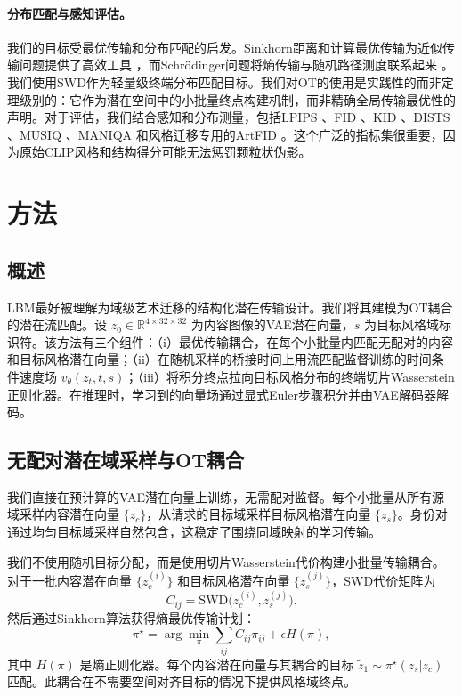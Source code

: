 \documentclass[letterpaper]{article}
\begin{document}
\paragraph{分布匹配与感知评估。}
我们的目标受最优传输和分布匹配的启发。Sinkhorn距离和计算最优传输为近似传输问题提供了高效工具 \cite{cuturi2013sinkhorn,peyre2019computational}，而Schrödinger问题将熵传输与随机路径测度联系起来 \cite{leonard2014survey}。我们使用SWD作为轻量级终端分布匹配目标。我们对OT的使用是实践性的而非定理级别的：它作为潜在空间中的小批量终点构建机制，而非精确全局传输最优性的声明。对于评估，我们结合感知和分布测量，包括LPIPS \cite{zhang2018lpips}、FID \cite{heusel2017fid}、KID \cite{binkowski2018kid}、DISTS \cite{ding2020dists}、MUSIQ \cite{ke2021musiq}、MANIQA \cite{yang2022maniqa}和风格迁移专用的ArtFID \cite{wright2022artfid}。这个广泛的指标集很重要，因为原始CLIP风格和结构得分可能无法惩罚颗粒状伪影。

\section{方法}
\subsection{概述}
LBM最好被理解为域级艺术迁移的结构化潜在传输设计。我们将其建模为OT耦合的潜在流匹配。设 $z_0 \in \mathbb{R}^{4 \times 32 \times 32}$ 为内容图像的VAE潜在向量，$s$ 为目标风格域标识符。该方法有三个组件：（i）最优传输耦合，在每个小批量内匹配无配对的内容和目标风格潜在向量；（ii）在随机采样的桥接时间上用流匹配监督训练的时间条件速度场 $v_\theta(z_t,t,s)$；（iii）将积分终点拉向目标风格分布的终端切片Wasserstein正则化器。在推理时，学习到的向量场通过显式Euler步骤积分并由VAE解码器解码。

\subsection{无配对潜在域采样与OT耦合}
我们直接在预计算的VAE潜在向量上训练，无需配对监督。每个小批量从所有源域采样内容潜在向量 $\{z_c\}$，从请求的目标域采样目标风格潜在向量 $\{z_s\}$。身份对通过均匀目标域采样自然包含，这稳定了围绕同域映射的学习传输。

我们不使用随机目标分配，而是使用切片Wasserstein代价构建小批量传输耦合。对于一批内容潜在向量 $\{z_c^{(i)}\}$ 和目标风格潜在向量 $\{z_s^{(j)}\}$，SWD代价矩阵为
\begin{equation}
    C_{ij} = \mathrm{SWD}\bigl(z_c^{(i)}, z_s^{(j)}\bigr) .
\end{equation}
然后通过Sinkhorn算法获得熵最优传输计划：
\begin{equation}
    \pi^\star = \arg\min_\pi \sum_{ij} C_{ij}\pi_{ij} + \epsilon H(\pi),
\end{equation}
其中 $H(\pi)$ 是熵正则化器。每个内容潜在向量与其耦合的目标 $\tilde{z}_1 \sim \pi^\star(z_s|z_c)$ 匹配。此耦合在不需要空间对齐目标的情况下提供风格域终点。
\end{document}
